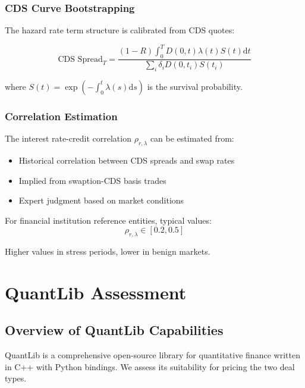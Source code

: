 \documentclass[conference]{IEEEtran}
\theoremstyle{definition}
\newcommand{\diff}{\mathrm{d}}
\begin{document}
\subsubsection{CDS Curve Bootstrapping}

The hazard rate term structure is calibrated from CDS quotes:

\begin{equation}
\text{CDS Spread}_T = \frac{(1-R) \int_0^T D(0,t) \lambda(t) S(t) \diff t}{\sum_{i} \delta_i D(0,t_i) S(t_i)}
\end{equation}

where $S(t) = \exp(-\int_0^t \lambda(s) \diff s)$ is the survival probability.

\subsubsection{Correlation Estimation}

The interest rate-credit correlation $\rho_{r,\lambda}$ can be estimated from:
\begin{itemize}
    \item Historical correlation between CDS spreads and swap rates
    \item Implied from swaption-CDS basis trades
    \item Expert judgment based on market conditions
\end{itemize}

For financial institution reference entities, typical values:
\begin{equation}
\rho_{r,\lambda} \in [0.2, 0.5]
\end{equation}

Higher values in stress periods, lower in benign markets.

\section{QuantLib Assessment}

\subsection{Overview of QuantLib Capabilities}

QuantLib is a comprehensive open-source library for quantitative finance written in C++ with Python bindings. We assess its suitability for pricing the two deal types.
\end{document}
